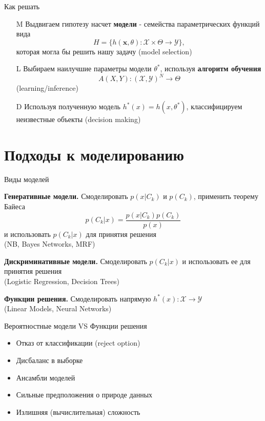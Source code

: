 \documentclass[10pt]{beamer}
\begin{document}
\begin{frame}{Как решать}

\begin{enumerate}

\item[M] Выдвигаем гипотезу насчет {\bf модели} - семейства параметрических функций вида
\[
H = \{h(\mathbf{x}, \theta): \mathcal{X} \times \Theta \rightarrow \mathcal{Y} \},
\]
которая могла бы решить нашу задачу (model selection)

\item[L] Выбираем наилучшие параметры модели $\theta^*$, используя {\bf алгоритм обучения}
\[
A(X, Y) : (\mathcal{X}, \mathcal{Y})^N \rightarrow \Theta
\]
(learning/inference)

\item[D] Используя полученную модель $h^*(x) = h(x, \theta^*)$, классифицируем неизвестные объекты (decision making)

\end{enumerate}

\end{frame}

\section{Подходы к моделированию}

\begin{frame}{Виды моделей}

{\bf Генеративные модели.} Смоделировать $p(x | C_k)$ и $p(C_k)$, применить теорему Байеса
\[
p(C_k | x) = \frac{p(x | C_k) p(C_k)}{p(x)}
\]
и использовать $p(C_k | x)$ для принятия решения \\ (NB, Bayes Networks, MRF)
\vspace{1em}

{\bf Дискриминативные модели.} Смоделировать $p(C_k | x)$ и использовать ее для принятия решения \\ (Logistic Regression, Decision Trees)
\vspace{1em}

{\bf Функции решения.} Смоделировать напрямую $h^*(x): \mathcal{X} \rightarrow \mathcal{Y}$ \\ (Linear Models, Neural Networks)

\end{frame}

\begin{frame}{Вероятностные модели VS Функции решения}

\begin{itemize}

\item Отказ от классификации (reject option)
\item Дисбаланс в выборке
\item Ансамбли моделей
\item Сильные предположения о природе данных
\item Излишняя (вычислительная) сложность

\end{itemize}

\end{frame}
\end{document}
